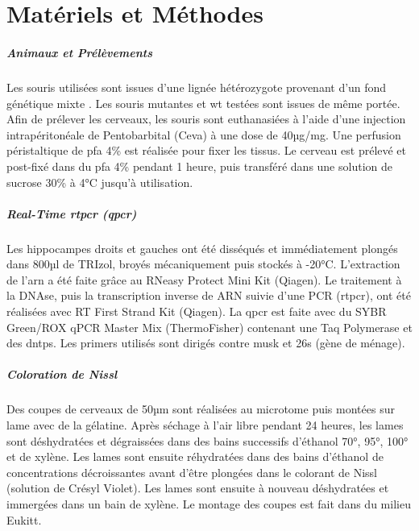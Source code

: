 \chapter{Matériels et Méthodes}

\paragraph{Animaux et Prélèvements}
\label{sec:AnimEtPrelev}
	Les souris utilisées sont issues d'une lignée hétérozygote provenant d'un fond génétique mixte \cite{Messeant2015, Messeant2017}. Les souris mutantes \mcrd et \gls{wt} testées sont issues de même portée. Afin de prélever les cerveaux, les souris sont  euthanasiées à l'aide d'une injection intrapéritonéale de Pentobarbital (Ceva\textregistered) à une dose de 40µg/mg. Une perfusion péristaltique de \gls{pfa} 4\% est réalisée pour fixer les tissus. Le cerveau est prélevé et post-fixé dans du \gls{pfa} 4\% pendant 1 heure, puis transféré dans une solution de sucrose 30\% à 4°C jusqu'à utilisation.
	
\paragraph{Real-Time \acrshort{rtpcr} (\acrshort{qpcr})}
\label{sec:qPCR}
	Les hippocampes droits et gauches ont été disséqués et immédiatement plongés dans 800µl de TRIzol\textregistered, broyés mécaniquement puis stockés à -20°C. L'extraction de l'\acrshort{arn} a été faite grâce au RNeasy Protect Mini Kit (Qiagen\textregistered). Le traitement à la DNAse, puis la transcription inverse de ARN suivie d'une PCR (\acrshort{rtpcr}), ont été réalisées avec RT First Strand Kit (Qiagen\textregistered). La \gls{qpcr} est faite avec du SYBR Green/ROX qPCR Master Mix (ThermoFisher\textregistered) contenant une Taq Polymerase et des \glspl{dntp}. Les primers utilisés sont dirigés contre \gls{musk} et \acrshort{26s} (gène de ménage).
	
\paragraph{Coloration de Nissl}
\label{sec:Nissl}
	Des coupes de cerveaux de 50µm sont réalisées au microtome puis montées sur lame avec de la gélatine. Après séchage à l'air libre pendant 24 heures, les lames sont déshydratées et dégraissées dans des bains successifs d'éthanol 70°, 95°, 100° et de xylène. Les lames sont ensuite réhydratées dans des bains d'éthanol de concentrations décroissantes avant d'être plongées dans le colorant de Nissl (solution de Crésyl Violet).  Les lames sont ensuite  à nouveau déshydratées et immergées dans un bain de xylène. Le montage des coupes est fait dans du milieu Eukitt\textregistered.
	

